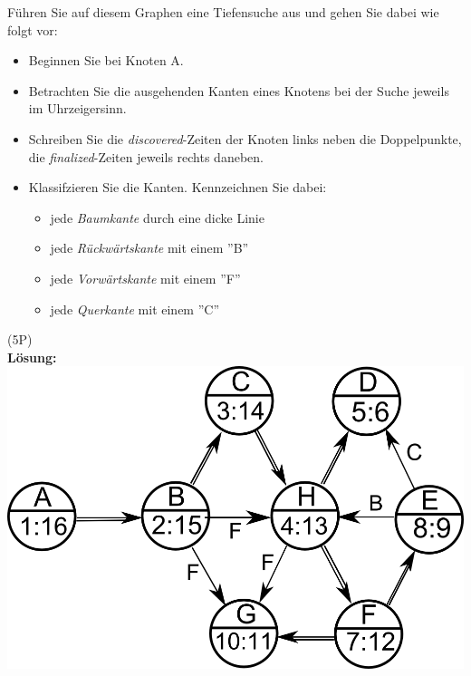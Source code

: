 \documentclass{scrartcl}
\begin{document}
\begin{enumerate}[(1)]
\begin{center}
\end{center}
Führen Sie auf diesem Graphen eine Tiefensuche aus und gehen Sie dabei wie folgt vor:
\begin{itemize}
	\item Beginnen Sie bei Knoten A.
	\item Betrachten Sie die ausgehenden Kanten eines Knotens bei der Suche jeweils im Uhrzeigersinn.
	\item Schreiben Sie die \textit{discovered}-Zeiten der Knoten links neben die Doppelpunkte, die \textit{finalized}-Zeiten jeweils rechts daneben.
	\item Klassifzieren Sie die Kanten. Kennzeichnen Sie dabei:
	\begin{itemize}
		\item jede \textit{Baumkante} durch eine dicke Linie
		\item jede \textit{Rückwärtskante} mit einem ''B''
		\item jede \textit{Vorwärtskante} mit einem ''F''
		\item jede \textit{Querkante} mit einem ''C''
	\end{itemize} 
\end{itemize}
(5P)\\
\textbf{Lösung:}\\
\includegraphics[width=0.75\linewidth]{images/tiefensuche_loes}\\

\end{enumerate}
\end{document}
